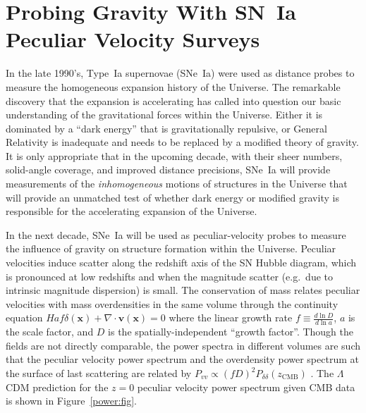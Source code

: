 \section{Probing Gravity With SN~Ia  Peculiar Velocity Surveys}
\label{science:sec}
In the late 1990's, Type~Ia supernovae (SNe~Ia) were used as distance probes to measure the homogeneous expansion history of the Universe.  The remarkable discovery
that the expansion is accelerating  has called into question our basic understanding of the gravitational forces within the Universe.  Either it
is dominated by a ``dark energy'' that is gravitationally repulsive, or General Relativity is inadequate and needs to be replaced by a modified theory of
gravity.  It is only appropriate that in the upcoming decade, with their sheer numbers, solid-angle coverage,
and improved distance precisions, SNe~Ia will provide measurements of the {\it inhomogeneous} motions of structures in the Universe
that will provide an unmatched test of whether dark energy or modified gravity is responsible for the accelerating expansion of the Universe.

In the next decade, SNe~Ia will be used as peculiar-velocity probes to measure  the influence of gravity on structure formation within the Universe.
Peculiar velocities induce scatter along the redshift axis of the SN Hubble diagram, which is
pronounced at low redshifts and when the magnitude scatter (e.g.\ due to intrinsic magnitude dispersion) is small.
The conservation of mass relates peculiar velocities  with mass overdensities in the same volume through the continuity equation
$Haf\delta(\mathbf{x}) + \nabla \cdot \mathbf{v}(\mathbf{x}) =0$ where the linear growth rate $f \equiv \frac{d\ln{D}}{d\ln{a}}$, $a$ is the scale factor, and $D$ is  the spatially-independent
``growth factor''.
Though the fields are not directly comparable, the power spectra in different volumes are such that
the peculiar velocity power spectrum and the overdensity power spectrum at the surface of last scattering are related by
$P_{vv}\propto (fD)^2P_{\delta \delta}(z_{\text{CMB}})$  \citep{2006PhRvD..73l3526H,2011ApJ...741...67D}. 
The $\Lambda$CDM prediction for the $z=0$ peculiar velocity power spectrum given CMB data is shown in Figure~\ref{power:fig}.



